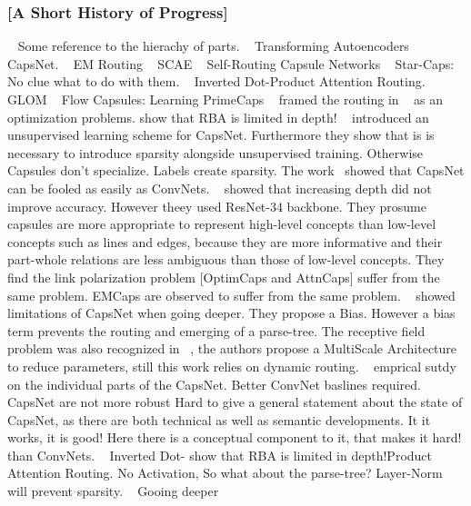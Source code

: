 \documentclass{article}
\begin{document}
\subsubsection*{[A Short History of Progress]}
~\cite{cogsci/Hinton79} Some reference to the hierachy of parts.
~\cite{icann/HintonKW11} Transforming Autoencoders
~\cite{nips/SabourFH17} CapsNet.
~\cite{iclr/HintonSF18} EM Routing
~\cite{nips/KosiorekSTH19} SCAE
~\cite{nips/HahnPK19} Self-Routing Capsule Networks
~\cite{nips/AhmedT19} Star-Caps: No clue what to do with them.
~\cite{iclr/TsaiSGS2} Inverted Dot-Product Attention Routing.
~\cite{corr/Hinton2021} GLOM
~\cite{icml/SabourTYHF21} Flow Capsules: Learning PrimeCaps
~\cite{iclr/Wang018} framed the routing in ~\cite{nips/SabourFH17} as an optimization problems.
 \cite{prl/PeerSR21} show that RBA is limited in depth!
~\cite{corr/Rawlinson2018} introduced an unsupervised learning scheme for CapsNet. Furthermore they show that is is necessary to introduce sparsity alongside unsupervised training. Otherwise Capsules don't specialize. Labels create sparsity.
The work~\cite{corr/Michels19} showed that CapsNet can be fooled as easily as ConvNets.
~\cite{acml/PaikKK19} showed that increasing depth did not improve accuracy. However theey used ResNet-34 backbone. They prosume
capsules are more appropriate to represent high-level concepts than low-level concepts
such as lines and edges, because they are more informative and their part-whole
relations are less ambiguous than those of low-level concepts. They find the link polarization problem [OptimCaps and AttnCaps] suffer from the same problem. EMCaps are observed to suffer from the same problem.
~\cite{prl/PeerSR21} showed limitations of CapsNet when going deeper. They propose a Bias. However a bias term prevents the routing and emerging of a parse-tree.
The receptive field problem was also recognized in ~\cite{spl/XiangZTZX18}, the authors propose a MultiScale Architecture to reduce parameters, still this work relies on dynamic routing.
~\cite{cvpr/GuT021} emprical sutdy on the individual parts of the CapsNet. Better ConvNet baslines required. CapsNet are not more robust 
Hard to give a general statement about the state of CapsNet, as there are both technical as well as semantic developments.
It it works, it is good! Here there is a conceptual component to it, that makes it hard!
than ConvNets.
~\cite{iclr/TsaiSGS20} Inverted Dot- \cite{prl/PeerSR21} show that RBA is limited in depth!Product Attention Routing. No Activation, So what about the parse-tree? Layer-Norm will prevent sparsity.
~\cite{cvpr/RajasegaranJJJS19} Gooing deeper
\end{document}

